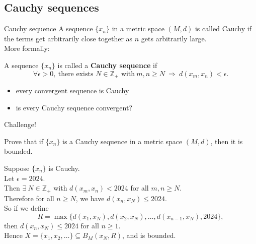 \documentclass{beamer}
\begin{document}
\subsection{Cauchy sequences}

\begin{frame}{Cauchy sequence}
A sequence $\{x_n\}$ in a metric space $(M,d)$ is called Cauchy if the terms get arbitrarily close together as $n$ gets arbitrarily large.\\
\pause
More formally:
\pause
\begin{defn}
A sequence $\{x_n\}$ is called a \textbf{Cauchy sequence} if
$$\forall \epsilon > 0,\ \text{there exists $N\in\mathbb Z_{+}$ with}\ m,n\geq N\ \Rightarrow\ d(x_m,x_n) < \epsilon.$$
\end{defn}
\begin{itemize}
\pause
\item every convergent sequence is Cauchy
\pause
\item is every Cauchy sequence convergent?
\end{itemize}
\end{frame}

\begin{frame}{Challenge!}
\begin{prob}
Prove that if $\{x_n\}$ is a Cauchy sequence in a metric space $(M,d)$, then it is bounded.
\end{prob}
\pause
\begin{soln}
\pause
Suppose $\{x_n\}$ is Cauchy.\\
\pause
Let $\epsilon = 2024$.\\
\pause
Then $\exists\ N\in\mathbb{Z}_+$ with $d(x_m,x_n) < 2024$ for all $m,n\geq N$.\\
\pause
Therefore for all $n\geq N$, we have $d(x_n,x_N)\leq 2024$.\\
\pause
So if we define
$$R = \max\{d(x_1,x_N), d(x_2,x_N),\dots, d(x_{n-1},x_N),2024\},$$
\pause
then $d(x_n,x_N)\leq 2024$ for all $n\geq 1$.\\
\pause
Hence $X = \{x_1,x_2,\dots\}\subseteq B_M(x_N,R)$, and is bounded.
\end{soln}
\end{frame}
\end{document}
